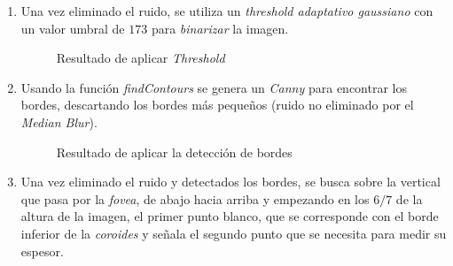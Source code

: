 \begin{enumerate}
\begin{enumerate}[label*=\arabic*.]
\begin{enumerate}[label*=\arabic*.]
    \item Una vez eliminado el ruido, se utiliza un \emph{threshold
        adaptativo
        gaussiano} con
      un valor umbral de $173$ para \emph{binarizar} la imagen.

      \begin{figure}[H]
        \caption{Resultado de aplicar \emph{Threshold}}
        \centering \setlength\fboxsep{0pt} \setlength\fboxrule{0.5pt}
      \end{figure}

    \item Usando la función
      \emph{findContours} se genera un
      \emph{Canny} para encontrar los
      bordes, descartando los bordes más pequeños (ruido no eliminado
      por el \emph{Median Blur}).

      \begin{figure}[H]
        \caption{Resultado de aplicar la detección de bordes}
        \centering \setlength\fboxsep{0pt} \setlength\fboxrule{0.5pt}
      \end{figure}

    \item Una vez eliminado el ruido y detectados los bordes, se busca
      sobre la vertical que pasa por la \emph{\gls{fovea}}, de abajo
      hacia arriba y empezando en los $6/7$ de la altura de la imagen,
      el primer punto blanco, que se corresponde con el borde inferior
      de la \emph{\gls{coroides}} y señala el segundo punto que se
      necesita para medir su espesor.


\end{enumerate}
\end{enumerate}
\end{enumerate}
